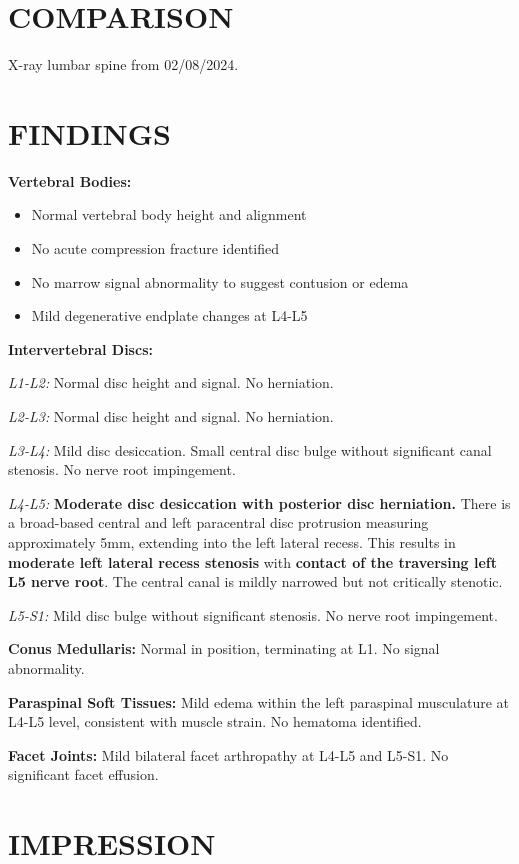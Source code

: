 \documentclass[11pt]{article}
\begin{document}
\section*{COMPARISON}

X-ray lumbar spine from 02/08/2024.

\section*{FINDINGS}

\textbf{Vertebral Bodies:}
\begin{itemize}[nosep]
\item Normal vertebral body height and alignment
\item No acute compression fracture identified
\item No marrow signal abnormality to suggest contusion or edema
\item Mild degenerative endplate changes at L4-L5
\end{itemize}

\textbf{Intervertebral Discs:}

\textit{L1-L2:} Normal disc height and signal. No herniation.

\textit{L2-L3:} Normal disc height and signal. No herniation.

\textit{L3-L4:} Mild disc desiccation. Small central disc bulge without significant canal stenosis. No nerve root impingement.

\textit{L4-L5:} \textbf{Moderate disc desiccation with posterior disc herniation.} There is a broad-based central and left paracentral disc protrusion measuring approximately 5mm, extending into the left lateral recess. This results in \textbf{moderate left lateral recess stenosis} with \textbf{contact of the traversing left L5 nerve root}. The central canal is mildly narrowed but not critically stenotic.

\textit{L5-S1:} Mild disc bulge without significant stenosis. No nerve root impingement.

\textbf{Conus Medullaris:} Normal in position, terminating at L1. No signal abnormality.

\textbf{Paraspinal Soft Tissues:} Mild edema within the left paraspinal musculature at L4-L5 level, consistent with muscle strain. No hematoma identified.

\textbf{Facet Joints:} Mild bilateral facet arthropathy at L4-L5 and L5-S1. No significant facet effusion.

\section*{IMPRESSION}
\end{document}
